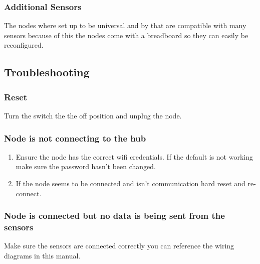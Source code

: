     \subsubsection{Additional Sensors}
      The nodes where set up to be universal and by that are compatible with
      many sensors because of this the nodes come with a breadboard so they can
      easily be reconfigured.\\
\newpage
  \subsection{Troubleshooting}
  \subsubsection{Reset}
  Turn the switch the the off position and unplug the node.
  \subsubsection{Node is not connecting to the hub}
  \begin{enumerate}
    \item Ensure the node has the correct wifi credentials. If the default is not
    working make sure the password hasn't been changed.
    \item If the node seems to be connected and isn't communication hard reset and re-connect.
  \end{enumerate}
  \subsubsection{Node is connected but no data is being sent from the sensors}
  Make sure the sensors are connected correctly you can reference the wiring diagrams
  in this manual.
